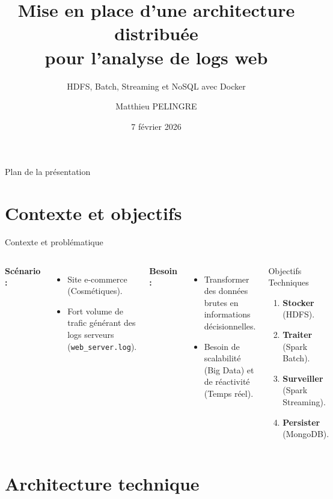 \documentclass[aspectratio=169]{beamer}
\title[Big Data]{Mise en place d'une architecture distribuée\\pour l'analyse de logs web}
\subtitle{HDFS, Batch, Streaming et NoSQL avec Docker}
\author{Matthieu PELINGRE}
\institute{IDMC / M2SDD}
\date{7 février 2026}
\begin{document}
\begin{frame}
  \titlepage
\end{frame}

\begin{frame}{Plan de la présentation}
  \tableofcontents
\end{frame}

\section{Contexte et objectifs}

\begin{frame}{Contexte et problématique}
  \begin{columns}
    \textbf{Scénario :}
    \begin{itemize}
        \item Site e-commerce (Cosmétiques).
        \item Fort volume de trafic générant des logs serveurs (\texttt{web\_server.log}).
    \end{itemize}
    
    \vspace{0.5cm}
    \textbf{Besoin :}
    \begin{itemize}
        \item Transformer des données brutes en informations décisionnelles.
        \item Besoin de scalabilité (Big Data) et de réactivité (Temps réel).
    \end{itemize}

    \begin{alertblock}{Objectifs Techniques}
        \begin{enumerate}
            \item \textbf{Stocker} (HDFS).
            \item \textbf{Traiter} (Spark Batch).
            \item \textbf{Surveiller} (Spark Streaming).
            \item \textbf{Persister} (MongoDB).
        \end{enumerate}
    \end{alertblock}
  \end{columns}
\end{frame}

\section{Architecture technique}
\end{document}
